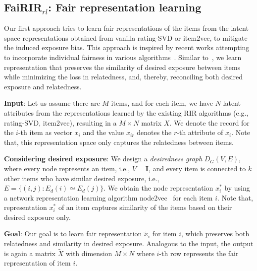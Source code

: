 \subsection{\textbf{FaiRIR$_{rl}$}: Fair representation learning} \label{sec: Phase 1}

Our first approach tries to learn fair representations of the items from the %
latent space representations obtained from %
vanilla rating-SVD or item2vec, to mitigate the induced exposure bias.
This approach is inspired by %
recent works attempting to incorporate individual fairness in various algorithms~\cite{zemel2013learning, lahoti2019ifair, lahoti2019operationalizing}.
Similar to~\cite{lahoti2019ifair}, we learn %
representation that preserves the similarity of desired exposure between items while minimizing the loss in relatedness, and, thereby, reconciling both desired exposure and relatedness. 

\vspace{1 mm}
\noindent
\textbf{Input}: Let us assume there are $M$ items, and for each item, we have $N$ latent attributes from the representations learned by the existing %
RIR algorithms (e.g., rating-SVD, item2vec), resulting in %
a $M \times N$ matrix $X$. We denote the record for the $i$-th item %
as vector $x_i$ and the value $x_{ir}$ denotes the $r$-th attribute of $x_i$. %
Note that, this representation space only captures %
the relatedness between %
items.

\vspace{1 mm}
\noindent
\textbf{Considering desired exposure}:  
We design a \textit{desiredness graph} $D_G(V, E)$, where every node represents an item, i.e., $V=\mathbf{I}$, and every item is connected to $k$ other items who have similar desired exposure, i.e., $E = \{(i,j) : E_d(i)\simeq E_d(j)\}$. 
We obtain the node representation ${x}_{i}^{*}$ by using a network representation learning algorithm node2vec~\cite{grover2016node2vec} for each item $i$. Note that, representation ${x}_{i}^{*}$ of an item captures similarity of the items based on their desired exposure only.%

\vspace{1 mm}
\noindent
\textbf{Goal}: Our goal is to learn fair representation $\tilde{x}_i$ for item $i$, which %
preserves both relatedness and similarity in desired exposure.
Analogous to the input, the output is again a matrix $\tilde{X}$ with dimension $M \times N$ where $i$-th row represents the fair representation of item $i$.

